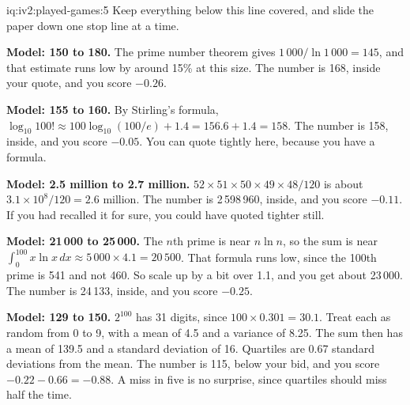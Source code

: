 \begin{solution}{iq:iv2:played-games:5}
Keep everything below this line covered, and slide the paper down one stop line at a time.

\ivstop
\textbf{Model: 150 to 180.} The prime number theorem gives $1\,000/\ln 1\,000 = 145$, and that estimate runs low by around 15\% at this size. The number is 168, inside your quote, and you score $-0.26$.

\ivstop
\textbf{Model: 155 to 160.} By Stirling's formula, $\log_{10} 100! \approx 100\log_{10}(100/e) + 1.4 = 156.6 + 1.4 = 158$. The number is 158, inside, and you score $-0.05$. You can quote tightly here, because you have a formula.

\ivstop
\textbf{Model: 2.5 million to 2.7 million.} $52 \times 51 \times 50 \times 49 \times 48/120$ is about $3.1 \times 10^8/120 = 2.6$ million. The number is 2\,598\,960, inside, and you score $-0.11$. If you had recalled it for sure, you could have quoted tighter still.

\ivstop
\textbf{Model: 21\,000 to 25\,000.} The $n$th prime is near $n \ln n$, so the sum is near $\int_0^{100} x\ln x\,dx \approx 5\,000 \times 4.1 = 20\,500$. That formula runs low, since the 100th prime is 541 and not 460. So scale up by a bit over 1.1, and you get about 23\,000. The number is 24\,133, inside, and you score $-0.25$.

\ivstop
\textbf{Model: 129 to 150.} $2^{100}$ has 31 digits, since $100 \times 0.301 = 30.1$. Treat each as random from 0 to 9, with a mean of 4.5 and a variance of 8.25. The sum then has a mean of 139.5 and a standard deviation of 16. Quartiles are 0.67 standard deviations from the mean. The number is 115, below your bid, and you score $-0.22 - 0.66 = -0.88$. A miss in five is no surprise, since quartiles should miss half the time.


\end{solution}
